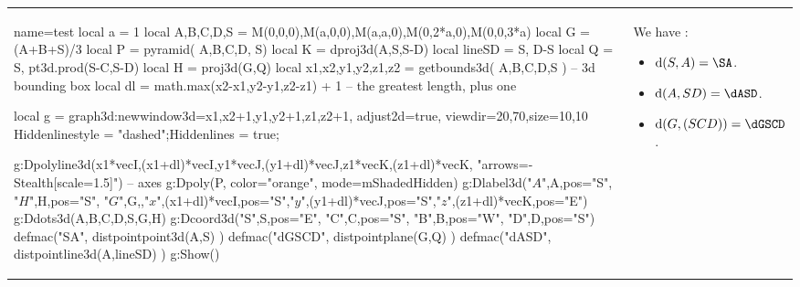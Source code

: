 \documentclass{standalone}
\begin{document}
\begin{tabular}{m{10cm}m{7cm}}
\begin{luadraw}{name=test}
local a = 1
local A,B,C,D,S = M(0,0,0),M(a,0,0),M(a,a,0),M(0,2*a,0),M(0,0,3*a)
local G = (A+B+S)/3
local P = pyramid( {A,B,C,D}, S)
local K = dproj3d(A,{S,S-D})
local lineSD = {S, D-S} 
local Q = {S, pt3d.prod(S-C,S-D)}
local H = proj3d(G,Q)
local x1,x2,y1,y2,z1,z2 = getbounds3d( {A,B,C,D,S} ) -- 3d bounding box
local dl = math.max(x2-x1,y2-y1,z2-z1) + 1 -- the greatest length, plus one

local g = graph3d:new{window3d={x1,x2+1,y1,y2+1,z1,z2+1}, adjust2d=true, viewdir={20,70},size={10,10}}
Hiddenlinestyle = "dashed";Hiddenlines = true;

g:Dpolyline3d({{x1*vecI,(x1+dl)*vecI},{y1*vecJ,(y1+dl)*vecJ},{z1*vecK,(z1+dl)*vecK}}, "arrows={-Stealth[scale=1.5]}") -- axes
g:Dpoly(P, {color="orange", mode=mShadedHidden})
 g:Dlabel3d("$A$",A,{pos="S"}, "$H$",H,{pos="S"}, "$G$",G,{},"$x$",(x1+dl)*vecI,{pos="S"},"$y$",(y1+dl)*vecJ,{pos="S"},"$z$",(z1+dl)*vecK,{pos="E"})
g:Ddots3d({A,B,C,D,S,G,H})
g:Dcoord3d("S",S,{pos="E"}, "C",C,{pos="S"}, "B",B,{pos="W"}, "D",D,{pos="S"})
defmac("SA", distpointpoint3d(A,S) )
defmac("dGSCD", distpointplane(G,Q) )
defmac("dASD", distpointline3d(A,lineSD) )
g:Show()
\end{luadraw}
&
We have :
\begin{itemize}
    \item $\mathrm d(S,A) = \SA$.
    \item $\mathrm d(A, SD) = \dASD$.
    \item $\mathrm d(G,(SCD)) = \dGSCD$.
\end{itemize}
\end{tabular}
\end{document}
